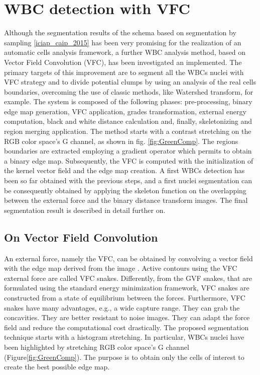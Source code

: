{	\section{WBC detection with VFC} %
	\label{visapp2018}
	Although the segmentation results of the schema based on segmentation by sampling \ref{iciap_caip_2015} has been very promising for the realization of an automatic cells analysis framework, a further WBC analysis method, based on Vector Field Convolution (VFC), has been investigated an implemented.
	The primary targets of this improvement are to segment all the WBCs nuclei with VFC strategy and to divide potential clumps by using an analysis of the real cells boundaries, overcoming the use of classic methods, like Watershed transform, for example. 
	The system is composed of the following phases: pre-processing, binary edge map generation, VFC \cite{Bing} application, grades transformation, external energy computation, black and white distance calculation and, finally, skeletonizing and region merging application. The method starts with a contrast stretching on the RGB color space's G channel, as shown in fig. \ref{fig:GreenComp}. 
	The regions boundaries are extracted employing a gradient operator which permits to obtain a binary edge map. Subsequently, the VFC is computed with the initialization of the kernel vector field and the edge map creation. A first WBCs detection has been so far obtained with the previous steps, and a first nuclei segmentation can be consequently obtained by applying the skeleton function on the overlapping between the external force and the binary distance transform images. The final segmentation result is described in detail further on.
	
	\subsection{On Vector Field Convolution}
	An external force, namely the VFC, can be obtained by convolving a vector field with the edge map derived from the image \cite{Bing}. 
	Active contours using the VFC external force are called VFC snakes. Differently, from the GVF \cite{Xu} snakes, that are formulated using the standard energy minimization framework, VFC snakes are constructed from a state of equilibrium between the forces. Furthermore, VFC snakes have many advantages, e.g., a wide capture range. They can grab the concavities. They are better resistant to noise images. They can adapt the force field and reduce the computational cost drastically.
	The proposed segmentation technique starts with a histogram stretching. In particular, WBCs nuclei have been highlighted by stretching RGB color space's G channel (Figure\ref{fig:GreenComp}).
	The purpose is to obtain only the cells of interest to create the best possible edge map.
	
}
